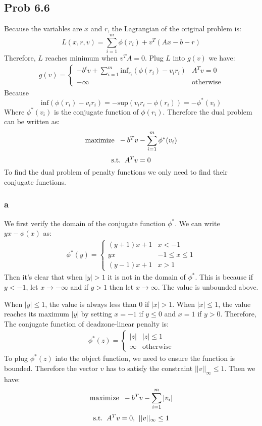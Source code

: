 \documentclass[10pt,a4paper]{article}
\begin{document}
\subsection{Prob 6.6}
Because the variables are $x$ and $r$, the Lagrangian of the
original problem is:
$$
L(x,r,v) = \sum_{i=1}^{m}\phi(r_i)+v^T(Ax-b-r)
$$
Therefore, $L$ reaches minimum when $v^TA=0$. Plug $L$ into
$g(v)$ we have: 
\begin{align*}
  g(v)=
  \begin{cases}
    -b^tv+\sum_{i=1}^{m}\text{inf}_{r_i}(\phi(r_i)-v_ir_i) & A^Tv=0 \\
    -\infty & \text{otherwise}
  \end{cases}
\end{align*}
Because 
$$\text{inf}(\phi(r_i) - v_ir_i) = - \text{sup}(v_ir_i - \phi(r_i)) = -\phi^*(v_i)$$
Where $\phi^*(v_i)$ is the conjugate function of
$\phi(r_i)$. Therefore the dual problem can be written as:
$$\text{maximize\;\;} -b^Tv-\sum_{i=1}^{m}\phi^*(v_i)$$
$$\text{s.t.\;\;} A^Tv=0$$
To find the dual problem of penalty functions we only need
to find their conjugate functions.

\subsubsection{a}
We first verify the domain of the conjugate function $\phi^*$. We can
write $yx-\phi(x)$ as:
\begin{align*}
  \phi^*(y)=
  \begin{cases}
    (y+1)x+1 & x<-1\\
    yx & -1\leq x\leq 1\\
    (y-1)x+1 & x>1
  \end{cases}
\end{align*}
Then it's clear that when $|y|>1$ it is not in the domain of
$\phi^*$. This is because if $y<-1$, let $x\rightarrow
-\infty$ and if $y>1$ then let $x \rightarrow \infty$. The
value is unbounded above.

When $|y|\leq 1$, the value is always less than $0$ if
$|x|>1$. When $|x|\leq 1$, the value reaches its maximum
$|y|$ by setting $x=-1$ if $y\leq 0$ and $x=1$ if $y>0$.
Therefore, The conjugate function of deadzone-linear penalty
is:
\begin{align*}
  \phi^*(z) = 
  \begin{cases}
    |z| & |z|\leq 1\\
    \infty & \text{otherwise}
  \end{cases}
\end{align*}
To plug $\phi^*(z)$ into the object function, we need to
ensure the function is bounded. Therefore the vector $v$
has to satisfy the constraint $||v||_{\infty}\leq 1$. Then
we have:
$$\text{maximize\;\;} -b^Tv-\sum_{i=1}^{m}|v_i|$$
$$\text{s.t.\;\;} A^Tv=0\text{,\;\;} ||v||_{\infty}\leq 1$$
\end{document}
